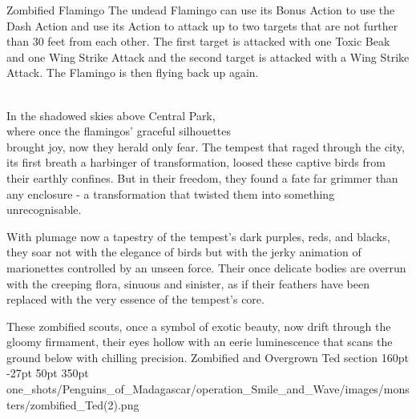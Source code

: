 \begin{DndMonster}[width=0.5\textwidth]{Zombified Flamingo}
	The undead Flamingo can use its Bonus Action to use the Dash Action and use its Action to attack up to two targets that are not further than 30 feet from each other. The first target is attacked with one Toxic Beak and one Wing Strike Attack and the second target is attacked with a Wing Strike Attack. The Flamingo is then flying back up again.
      
\end{DndMonster}
\vfill\eject\vspace*{2.15cm}\hfill\\
\hspace*{1.75cm}In the shadowed skies above Central Park,\\\hspace*{1.5cm}where once the flamingos' graceful silhouettes\\brought joy, now they herald only fear. The tempest that raged through the city, its first breath a harbinger of transformation, loosed these captive birds from their earthly confines. But in their freedom, they found a fate far grimmer than any enclosure - a transformation that twisted them into something unrecognisable.

With plumage now a tapestry of the tempest's dark purples, reds, and blacks, they soar not with the elegance of birds but with the jerky animation of marionettes controlled by an unseen force. Their once delicate bodies are overrun with the creeping flora, sinuous and sinister, as if their feathers have been replaced with the very essence of the tempest's core.

These zombified scouts, once a symbol of exotic beauty, now drift through the gloomy firmament, their eyes hollow with an eerie luminescence that scans the ground below with chilling precision.
\def\primarycolor{titlered}%
\def\secondarycolor{white}%
\MonsterBannerGraphic%
	{Zombified and Overgrown Ted} %
	{section} %
	{160pt} %
	{-27pt} %
	{50pt} %
	{350pt} %
	{\PATH one_shots/Penguins_of_Madagascar/operation_Smile_and_Wave/images/monsters/zombified_Ted(2).png} %
	{} %
\label{sec:ZombifiedTed}
%

